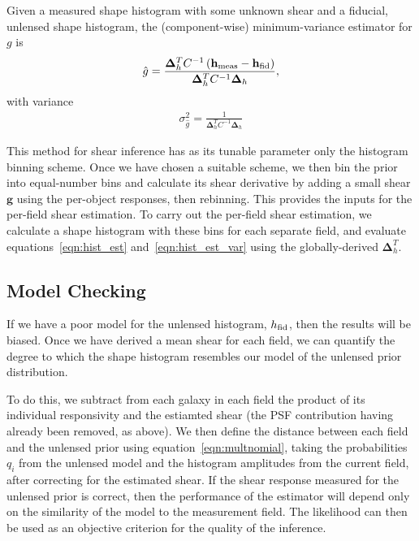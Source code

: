 \documentclass[iop]{emulateapj}
\begin{document}
Given a measured shape histogram with some unknown shear and a
fiducial, unlensed shape histogram, the (component-wise)
minimum-variance estimator for $g$ is
\begin{align}
\hat{g} = \frac{\mathbf{\Delta}_h^T C^{-1}\left( \mathbf{h}_{\rm meas} - \mathbf{h}_{\rm fid}\right)} {\mathbf{\Delta}_h^TC^{-1}\mathbf{\Delta}_h},
\label{eqn:hist_est}
\end{align}
with variance 
\begin{align}
\sigma^2_{\hat{g}} = \frac{1}{\mathbf{\Delta}_h^TC^{-1}\mathbf{\Delta}_h}
\label{eqn:hist_est_var}
\end{align}

This method for shear inference has as its tunable parameter only the
histogram binning scheme. Once we have chosen a suitable scheme, we
then bin the prior into equal-number bins and calculate its shear
derivative %
by adding a small shear $\mathbf{g}$ using the per-object responses,
then rebinning. This provides the inputs for the per-field shear
estimation.  To carry out the per-field shear estimation, we calculate
a shape histogram with these bins for each separate field, and
evaluate equations~\ref{eqn:hist_est} and~\ref{eqn:hist_est_var} using
the globally-derived $\mathbf{\Delta}_h^T$.

\subsection{Model Checking}
If we have a poor model for the unlensed histogram, $h_{\rm fid}$,
then the results will be biased. Once we have derived a mean shear for
each field, we can quantify the degree to which the shape histogram
resembles our model of the unlensed prior distribution.

To do this, we subtract from each galaxy in each field the product of
its individual responsivity and the estiamted shear (the PSF
contribution having already been removed, as above). We then define
the distance between each field and the unlensed prior using
equation~\ref{eqn:multnomial}, taking the probabilities $q_i$ from the
unlensed model and the histogram amplitudes from the current field,
after correcting for the estimated shear. If the shear response
measured for the unlensed prior is correct, then the performance of
the estimator will depend only on the similarity of the model to the
measurement field. The likelihood can then be used as an objective
criterion for the quality of the inference.
\end{document}
